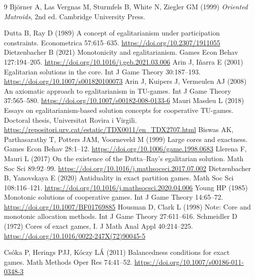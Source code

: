 \documentclass[11pt]{article}
\begin{document}
\begin{thebibliography}{9}
Bj\"orner A, Las Vergnas M, Sturmfels B, White N, Ziegler GM (1999)
\emph{Oriented Matroids}, 2nd ed. Cambridge University Press.

Dutta B, Ray D (1989) A concept of egalitarianism under participation
constraints. Econometrica 57:615--635.
\url{https://doi.org/10.2307/1911055}
Dietzenbacher B (2021) Monotonicity and egalitarianism.
Games Econ Behav 127:194--205.
\url{https://doi.org/10.1016/j.geb.2021.03.006}
Arin J, I\~narra E (2001) Egalitarian solutions in the core.
Int J Game Theory 30:187--193.
\url{https://doi.org/10.1007/s001820100073}
Arin J, Kuipers J, Vermeulen AJ (2008) An axiomatic approach to
egalitarianism in TU-games. Int J Game Theory 37:565--580.
\url{https://doi.org/10.1007/s00182-008-0133-6}
Mauri Masdeu L (2018) Essays on egalitarianism-based solution concepts for
cooperative TU-games. Doctoral thesis, Universitat Rovira i Virgili.
\url{https://repositori.urv.cat/estatic/TDX0011/en_TDX2707.html}
Biswas AK, Parthasarathy T, Potters JAM, Voorneveld M (1999) Large cores and
exactness. Games Econ Behav 28:1--12.
\url{https://doi.org/10.1006/game.1998.0683}
Llerena F, Mauri L (2017) On the existence of the Dutta--Ray's egalitarian
solution. Math Soc Sci 89:92--99.
\url{https://doi.org/10.1016/j.mathsocsci.2017.07.002}
Dietzenbacher B, Yanovskaya E (2020) Antiduality in exact partition games.
Math Soc Sci 108:116--121.
\url{https://doi.org/10.1016/j.mathsocsci.2020.04.006}
Young HP (1985) Monotonic solutions of cooperative games.
Int J Game Theory 14:65--72.
\url{https://doi.org/10.1007/BF01769885}
Housman D, Clark L (1998) Note: Core and monotonic allocation methods.
Int J Game Theory 27:611--616.
Schmeidler D (1972) Cores of exact games, I. J Math Anal Appl 40:214--225.
\url{https://doi.org/10.1016/0022-247X(72)90045-5}

Cs\'oka P, Herings PJJ, K\'oczy L\'A (2011) Balancedness conditions for exact
games. Math Methods Oper Res 74:41--52.
\url{https://doi.org/10.1007/s00186-011-0348-3}


\end{thebibliography}
\end{document}
